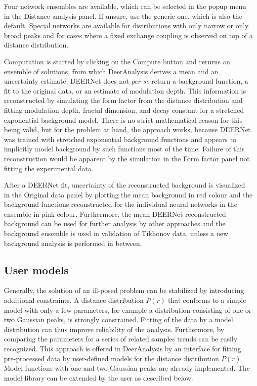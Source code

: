 \documentclass{article}
\begin{document}
Four network ensembles are available, which can be selected in the popup menu in the {\ttfamily Distance analysis} panel. If unsure, use the generic one, which is also the default. Special networks are available for distributions with only narrow or only broad peaks and for cases where a fixed exchange coupling is observed on top of a distance distribution.

Computation is started by clicking on the {\ttfamily Compute} button and returns an ensemble of solutions, from which DeerAnalysis derives a mean and an uncertainty estimate. DEERNet does not \emph{per se} return a background function, a fit to the original data, or an estimate of modulation depth. This information is reconstructed by simulating the form factor from the distance distribution and fitting modulation depth, fractal dimension, and decay constant for a stretched exponential background model. There is no strict mathematical reason for this being valid, but for the problem at hand, the approach works, because DEERNet was trained with stretched exponential background functions and appears to implicitly model background by such functions most of the time. Failure of this reconstruction would be apparent by the simulation in the {\ttfamily Form factor} panel not fitting the experimental data.

After a DEERNet fit, uncertainty of the reconstructed background is visualized in the {\ttfamily Original data} panel by plotting the mean background in red colour and the background functions reconstructed for the individual neural networks in the ensemble in pink colour. Furthermore, the mean DEERNet reconstructed background can be used for further analysis by other approaches and the background ensemble is used in validation of Tikhonov data, unless a new background analysis is performed in between.    

\subsection{User models}
Generally, the solution of an ill-posed problem can be stabilized by introducing additional constraints. A distance distribution $P(r)$ that conforms to a simple model with only a few parameters, for example a distribution consisting of one or two Gaussian peaks, is strongly constrained. Fitting of the data by a model distribution can thus improve reliability of the analysis. Furthermore, by comparing the parameters for a series of related samples trends can be easily recognized. This approach is offered in DeerAnalysis by an interface for fitting pre-processed data by user-defined models for the distance distribution $P(r)$. Model functions with one and two Gaussian peaks are already implemented. The model library can be extended by the user as described below.
\end{document}
